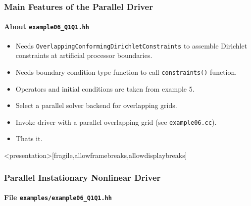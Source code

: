 \begin{frame}
\frametitle{Main Features of the Parallel Driver}
\framesubtitle{About \lstinline{example06_Q1Q1.hh}}
\begin{itemize}
\item Needs \lstinline{OverlappingConformingDirichletConstraints}
to assemble Dirichlet constraints at artificial processor boundaries.
\item Needs boundary condition type function to call \lstinline{constraints()} function.
\item Operators and initial conditions are taken from example 5.
\item Select a parallel solver backend for overlapping grids.
\item Invoke driver with a parallel overlapping grid (see \lstinline{example06.cc}).
\item Thats it.
\end{itemize}
\end{frame}

\begin{frame}<presentation>[fragile,allowframebreaks,allowdisplaybreaks]
\frametitle<presentation>{Parallel Instationary Nonlinear Driver}
\framesubtitle<presentation>{File \texttt{examples/example06\_Q1Q1.hh}}

\end{frame}

\cleardoublepage

